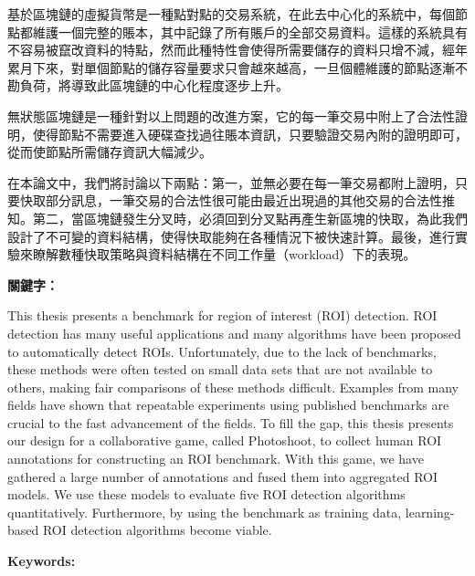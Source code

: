 \begin{abstractzh}
基於區塊鏈的虛擬貨幣是一種點對點的交易系統，在此去中心化的系統中，每個節點都維護一個完整的賬本，其中記錄了所有賬戶的全部交易資料。這樣的系統具有不容易被竄改資料的特點，然而此種特性會使得所需要儲存的資料只增不減，經年累月下來，對單個節點的儲存容量要求只會越來越高，一旦個體維護的節點逐漸不勘負荷，將導致此區塊鏈的中心化程度逐步上升。

無狀態區塊鏈是一種針對以上問題的改進方案，它的每一筆交易中附上了合法性證明，使得節點不需要進入硬碟查找過往賬本資訊，只要驗證交易內附的證明即可，從而使節點所需儲存資訊大幅減少。

在本論文中，我們將討論以下兩點：第一，並無必要在每一筆交易都附上證明，只要快取部分訊息，一筆交易的合法性很可能由最近出現過的其他交易的合法性推知。第二，當區塊鏈發生分叉時，必須回到分叉點再產生新區塊的快取，為此我們設計了不可變的資料結構，使得快取能夠在各種情況下被快速計算。最後，進行實驗來瞭解數種快取策略與資料結構在不同工作量（workload）下的表現。


\bigbreak
\noindent \textbf{關鍵字：}{\, \makeatletter \@keywordszh \makeatother}
\end{abstractzh}

\begin{abstracten}
This thesis presents a benchmark for region of interest (ROI)
detection. ROI detection has many useful applications and many
algorithms have been proposed to automatically detect ROIs.
Unfortunately, due to the lack of benchmarks, these methods were
often tested on small data sets that are not available to others,
making fair comparisons of these methods difficult. Examples from
many fields have shown that repeatable experiments using published
benchmarks are crucial to the fast advancement of the fields. To
fill the gap, this thesis presents our design for a collaborative
game, called Photoshoot, to collect human ROI annotations for
constructing an ROI benchmark. With this game, we have gathered a
large number of annotations and fused them into aggregated ROI
models. We use these models to evaluate five ROI detection
algorithms quantitatively. Furthermore, by using the benchmark as
training data, learning-based ROI detection algorithms become
viable.

\bigbreak
\noindent \textbf{Keywords:}{\, \makeatletter \@keywordsen \makeatother}
\end{abstracten}

\begin{comment}
\category{I2.10}{Computing Methodologies}{Artificial Intelligence --
Vision and Scene Understanding} \category{H5.3}{Information
Systems}{Information Interfaces and Presentation (HCI) -- Web-based
Interaction.}

\terms{Design, Human factors, Performance.}

\keywords{Region of interest, Visual attention model, Web-based
games, Benchmarks.}
\end{comment}
